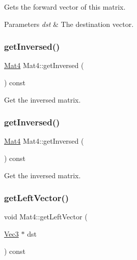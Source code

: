 Gets the forward vector of this matrix.


\begin{DoxyParams}{Parameters}
{\em dst} & The destination vector. \\
\hline
\end{DoxyParams}
\mbox{\label{classMat4_aa49b12b2cd25b28ab50e2ac41de592b4}} 
\subsubsection{\texorpdfstring{get\+Inversed()}{getInversed()}\hspace{0.1cm}{\footnotesize\ttfamily [1/2]}}
{\footnotesize\ttfamily \hyperlink{classMat4}{Mat4} Mat4\+::get\+Inversed (\begin{DoxyParamCaption}{ }\end{DoxyParamCaption}) const}

Get the inversed matrix. \mbox{\label{classMat4_aa49b12b2cd25b28ab50e2ac41de592b4}} 
\subsubsection{\texorpdfstring{get\+Inversed()}{getInversed()}\hspace{0.1cm}{\footnotesize\ttfamily [2/2]}}
{\footnotesize\ttfamily \hyperlink{classMat4}{Mat4} Mat4\+::get\+Inversed (\begin{DoxyParamCaption}{ }\end{DoxyParamCaption}) const}

Get the inversed matrix. \mbox{\label{classMat4_a53f91ec013e8a83c5b7a2395e17c626d}} 
\subsubsection{\texorpdfstring{get\+Left\+Vector()}{getLeftVector()}\hspace{0.1cm}{\footnotesize\ttfamily [1/2]}}
{\footnotesize\ttfamily void Mat4\+::get\+Left\+Vector (\begin{DoxyParamCaption}\item[{\hyperlink{classVec3}{Vec3} $\ast$}]{dst }\end{DoxyParamCaption}) const}

